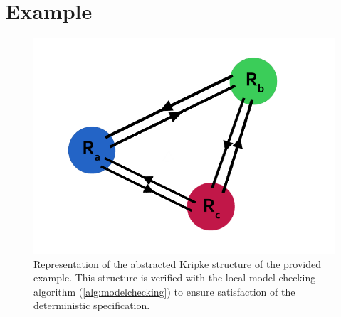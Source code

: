 

\section{Example}
{}
\begin{figure}
    \centering
    \includegraphics{./figures/abstract_kripke.png}
    \caption[Abstracted Kripke Structure]{Representation of the abstracted Kripke structure of the provided example. This structure is verified with the local model checking algorithm (\autoref{alg:modelchecking}) to ensure satisfaction of the deterministic \mucalc{} specification.} 
\label{fig:abs_kripke}
\end{figure}

